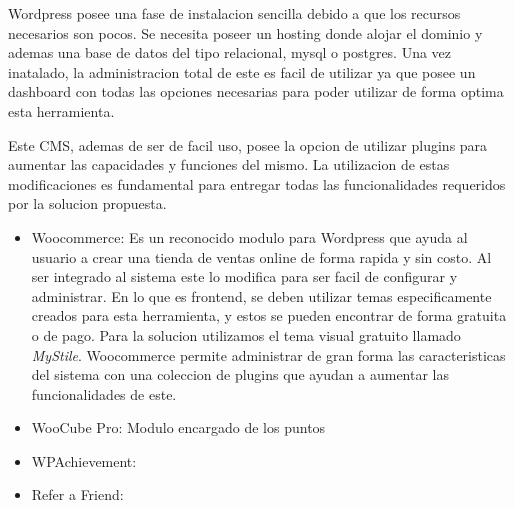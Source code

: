 Wordpress posee una fase de instalacion sencilla debido a que los recursos necesarios son pocos. Se 
necesita poseer un hosting donde alojar el dominio y ademas una base de datos del tipo relacional, mysql
o postgres. Una vez inatalado, la administracion total de este es facil de utilizar ya que posee un
dashboard con todas las opciones necesarias para poder utilizar de forma optima esta herramienta. 

Este CMS, ademas de ser de facil uso, posee la opcion de utilizar plugins para aumentar las capacidades y
funciones del mismo. La utilizacion de estas modificaciones es fundamental para entregar todas las
funcionalidades requeridos por la solucion propuesta.

\begin{itemize}

\item Woocommerce: Es un reconocido modulo para Wordpress que ayuda al usuario a crear una tienda de ventas 
online de forma rapida y sin costo. Al ser integrado al sistema este lo modifica para ser facil de configurar
y administrar. En lo que es frontend, se deben utilizar temas especificamente creados para esta herramienta, y 
estos se pueden encontrar de forma gratuita o de pago. Para la solucion utilizamos el tema visual gratuito llamado
\emph{MyStile}. Woocommerce permite administrar de gran forma las caracteristicas del sistema con una coleccion
de plugins que ayudan a aumentar las funcionalidades de este. 

\item WooCube Pro: Modulo encargado de los puntos

\item WPAchievement:

\item Refer a Friend:

\end{itemize}
 
























